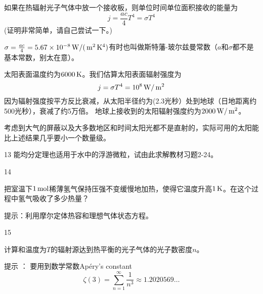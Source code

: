 \documentclass[CJK]{beamer}
\begin{document}
\begin{frame}
\bch
{\small 
如果在热辐射光子气体中放一个接收板，则单位时间单位面积接收的能量为
$$j = \frac{ac}{4}T^4 = \sigma T^4 $$
{\scriptsize (证明非常简单，请自己尝试一下。)}

$\sigma = \frac{ac}{4} = 5.67 \times 10^{-8} \,\mathrm{W}/(\,\mathrm{m}^2 \,\mathrm{K}^4)$有时也叫做斯特藩-玻尔兹曼常数（$a$和$\sigma$都不是基本常数，别太在意）。
}
\ech
\end{frame}

\begin{frame}
\bch

太阳表面温度约为$6000\,\mathrm{K}$。我们估算太阳表面辐射强度为
$$j = \sigma T^4 = 10^8 \,\mathrm{W}/\,\mathrm{m}^2 $$
因为辐射强度按平方反比衰减，从太阳半径约为(2.3光秒）处到地球（日地距离约500光秒），衰减了约5万倍。
地球上接收到的太阳辐射强度约为$2000\,\mathrm{W}/\,\mathrm{m}^2$。

\skiplines

考虑到大气的屏蔽以及大多数地区和时间太阳光都不是直射的，实际可用的太阳能比上述结果几乎要小一个数量级。

\ech
\end{frame}


\begin{frame}
\bch
\bitem
\item[13]{能均分定理也适用于水中的浮游微粒，试由此求解教材习题2-24。}
\item[14]{把室温下$1\,\mathrm{mol}$稀薄氢气保持压强不变缓慢地加热，使得它温度升高$1\,\mathrm{K}$。在这个过程中氢气吸收了多少热量？

\scriptsize
提示：利用摩尔定体热容和理想气体状态方程。
}
\item[15]{计算和温度为$T$的辐射源达到热平衡的光子气体的光子数密度$n$。

\skipline

{\scriptsize 提示 ： 要用到数学常数Ap{\'e}ry's constant
$$\zeta(3) = \sum_{n=1}^\infty \frac{1}{n^3} \approx 1.2020569\ldots $$}}
\eitem
\ech
\end{frame}
\end{document}
